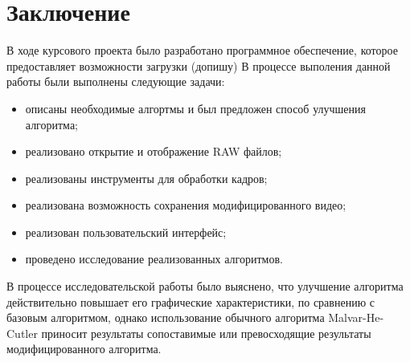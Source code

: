 \chapter*{Заключение}

В ходе курсового проекта было разработано программное обеспечение, которое предоставляет возможности загрузки (допишу)
В процессе выполения данной работы были выполнены следующие задачи:
\begin{itemize}
	\item описаны необходимые алгортмы и был предложен способ улучшения алгоритма;
	\item реализовано открытие и отображение RAW файлов;
	\item реализованы инструменты для обработки кадров;
	\item реализована возможность сохранения модифицированного видео;
	\item реализован пользовательский интерфейс;
	\item проведено исследование реализованных алгоритмов.
\end{itemize}

В процессе исследовательской работы было выяснено, что улучшение алгоритма действительно повышает его графические характеристики, по сравнению с базовым алгоритмом, однако использование обычного алгоритма Malvar-He-Cutler приносит результаты сопоставимые или превосходящие результаты модифицированного алгоритма.
